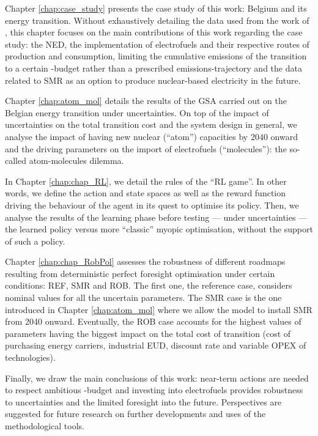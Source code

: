 Chapter \ref{chap:case_study} presents the case study of this work: Belgium and its energy transition. Without exhaustively detailing the data used from the work of \citet{limpens2021generating}, this chapter focuses on the main contributions of this work regarding the case study: the \gls{NED}, the implementation of electrofuels and their respective routes of production and consumption, limiting  the cumulative emissions of the transition to a certain -budget rather than a prescribed emissions-trajectory and the data related to \gls{SMR} as an option to produce nuclear-based electricity in the future.

Chapter \ref{chap:atom_mol} details the results of the \gls{GSA} carried out on the Belgian energy transition under uncertainties. On top of the impact of uncertainties on the total transition cost and the system design in general, we analyse the impact of having new nuclear (``atom'') capacities by 2040 onward and the driving parameters on the import of electrofuels (``molecules''): the so-called atom-molecules dilemma.

In Chapter \ref{chap:chap_RL}, we detail the rules of the ``\gls{RL} game''. In other words, we define the action and state spaces as well as the reward function driving the behaviour of the agent in its quest to optimise its policy. Then, we analyse the results of the learning phase before testing --- under uncertainties --- the learned policy versus more ``classic'' myopic optimisation, \ie without the support of such a policy.

Chapter \ref{chap:chap_RobPol} assesses the robustness of different roadmaps resulting from deterministic perfect foresight optimisation under certain conditions: REF, SMR and ROB. The first one, the reference case, considers nominal values for all the uncertain parameters. The SMR case is the one introduced in Chapter \ref{chap:atom_mol} where we allow the model to install \gls{SMR} from 2040 onward. Eventually, the ROB case accounts for the highest values of parameters having the biggest impact on the total cost of transition (\ie cost of purchasing energy carriers, industrial \gls{EUD}, discount rate and variable \gls{OPEX} of technologies).

Finally, we draw the main conclusions of this work: near-term actions are needed to respect ambitious -budget and investing into electrofuels provides robustness to uncertainties and the limited foresight into the future.  Perspectives are suggested for future research on further developments and uses of the methodological tools.